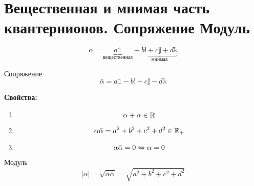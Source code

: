 \section{Вещественная и мнимая часть квантернионов. Сопряжение Модуль}

$$\alpha=\underbrace{a\mathbb{1}}_{\text{вещественная}}+\underbrace{b\mathbb{i}+c\mathbb{j}+d\mathbb{k}}_{\text{мнимая}}$$
\begin{Def}
Сопряжение
$$\bar\alpha=a\mathbb{1}-b\mathbb{i}-c\mathbb{j}-d\mathbb{k}$$
\end{Def}
{\bf Свойства:}
\begin{enumerate}
\item $$\alpha + \bar\alpha \in \mathbb{R}$$
\item $$\alpha\bar\alpha = a^2 + b^2 + c^2 + d^2 \in \mathbb{R}_+$$
\item $$\alpha\bar\alpha = 0 \Leftrightarrow \alpha = 0$$
\end{enumerate}

\begin{Def}
Модуль
$$|\alpha| = \sqrt{\alpha \bar\alpha} = \sqrt{a^2 + b^2 + c^2 + d^2}$$
\end{Def}